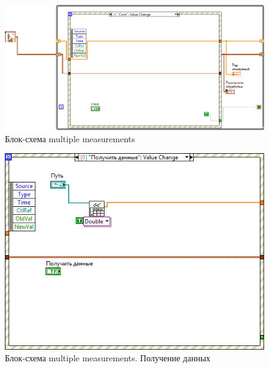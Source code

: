 \documentclass[a4paper,14pt]{article}
\begin{document}
\begin{figure}[H]
     \centering
     \includegraphics[width=\linewidth]{image/mp_schema}
    \caption{Блок-схема multiple measurements}\label{img:mp_schema}
\end{figure}

  \begin{figure}[H]
     \centering
     \includegraphics[width=0.7\linewidth]{image/mp_schema_0}
     \caption{Блок-схема multiple measurements. Получение данных}\label{img:mp_schema_scan}
 \end{figure}
\end{document}
